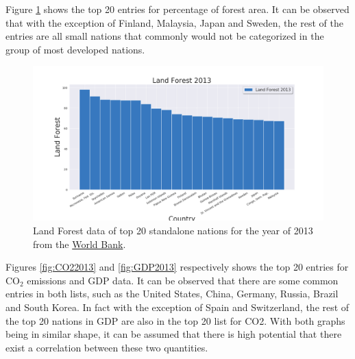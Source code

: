 \documentclass[11pt,a4paper,titlepage]{article}
\newcommand{\blankline}{\quad\pagebreak[2]}
\begin{document}
\blankline

Figure \ref{fig:LandForest2013} shows the top 20 entries for percentage of forest area. It can be observed that with the exception of Finland, Malaysia, Japan and Sweden, the rest of the entries are all small nations that commonly would not be categorized in the group of most developed nations.

\begin{figure}[!htbp]
    \begin{center}
        \includegraphics[width=\textwidth]{../Plots/LandForest_2013.png}
        \caption{Land Forest data of top 20 standalone nations for the year of 2013 from the \href{https://www.worldbank.org/}{World Bank}.}
        \label{fig:LandForest2013}
    \end{center}
\end{figure}

\blankline

Figures \ref{fig:CO22013} and \ref{fig:GDP2013} respectively shows the top 20 entries for CO$_{2}$ emissions and GDP data. It can be observed that there are some common entries in both lists, such as the United States, China, Germany, Russia, Brazil and South Korea. In fact with the exception of Spain and Switzerland, the rest of the top 20 nations in GDP are also in the top 20 list for CO2. With both graphs being in similar shape, it can be assumed that there is high potential that there exist a correlation between these two quantities.
\end{document}
